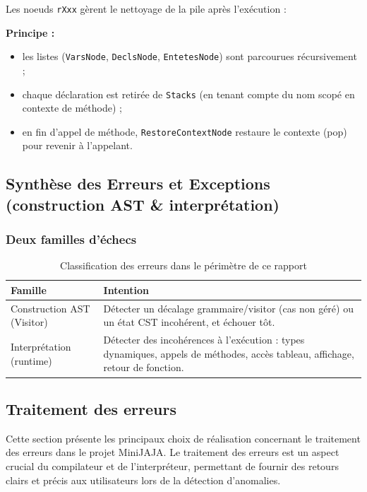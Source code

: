 Les noeuds \texttt{rXxx} gèrent le nettoyage de la pile après l'exécution :

\noindent\textbf{Principe :}
\begin{itemize}
    \item les listes (\texttt{VarsNode}, \texttt{DeclsNode}, \texttt{EntetesNode}) sont parcourues récursivement ;
    \item chaque déclaration est retirée de \texttt{Stacks} (en tenant compte du nom scopé en contexte de méthode) ;
    \item en fin d'appel de méthode, \texttt{RestoreContextNode} restaure le contexte (pop) pour revenir à l'appelant.
\end{itemize}
\newpage
\subsection{Synthèse des Erreurs et Exceptions (construction AST \& interprétation)}

\subsubsection{Deux familles d'échecs}

\begin{table}[h]
\centering
\begin{tabular}{|l|p{9.5cm}|}
\hline
    \textbf{Famille} & \textbf{Intention} \\
\hline
Construction AST (Visitor) & Détecter un décalage grammaire/visitor (cas non géré) ou un état CST incohérent, et échouer tôt. \\
\hline
Interprétation (runtime) & Détecter des incohérences à l'exécution : types dynamiques, appels de méthodes, accès tableau, affichage, retour de fonction. \\
\hline
\end{tabular}
\caption{Classification des erreurs dans le périmètre de ce rapport}
\end{table}


\subsection{Traitement des erreurs}\label{subsec:introduction}
Cette section présente les principaux choix de réalisation concernant le traitement des erreurs dans le projet MiniJAJA. Le traitement des erreurs est un aspect crucial du compilateur et de l'interpréteur, permettant de fournir des retours clairs et précis aux utilisateurs lors de la détection d'anomalies.

